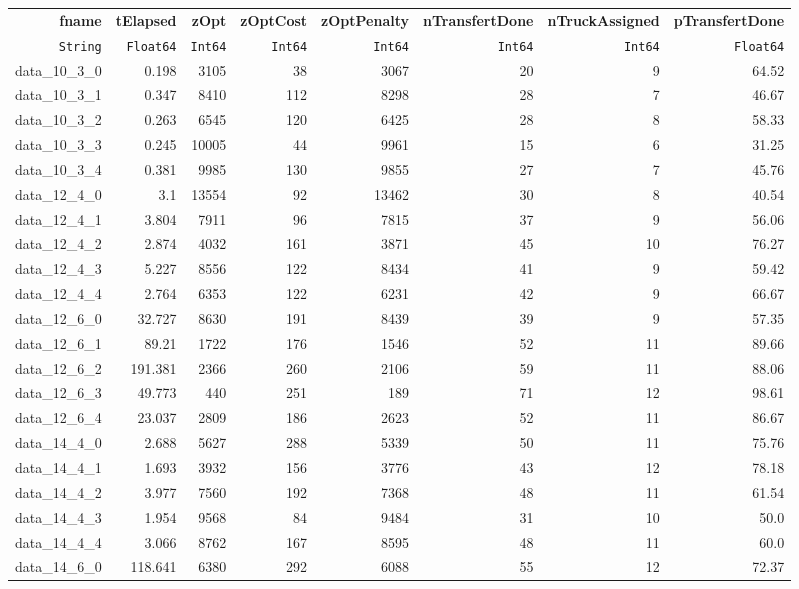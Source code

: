 \begin{tabular}{rrrrrrrr}
  \hline
  \textbf{fname} & \textbf{tElapsed} & \textbf{zOpt} & \textbf{zOptCost} & \textbf{zOptPenalty} & \textbf{nTransfertDone} & \textbf{nTruckAssigned} & \textbf{pTransfertDone} \\
  \texttt{String} & \texttt{Float64} & \texttt{Int64} & \texttt{Int64} & \texttt{Int64} & \texttt{Int64} & \texttt{Int64} & \texttt{Float64} \\\hline
  data\_10\_3\_0 & 0.198 & 3105 & 38 & 3067 & 20 & 9 & 64.52 \\
  data\_10\_3\_1 & 0.347 & 8410 & 112 & 8298 & 28 & 7 & 46.67 \\
  data\_10\_3\_2 & 0.263 & 6545 & 120 & 6425 & 28 & 8 & 58.33 \\
  data\_10\_3\_3 & 0.245 & 10005 & 44 & 9961 & 15 & 6 & 31.25 \\
  data\_10\_3\_4 & 0.381 & 9985 & 130 & 9855 & 27 & 7 & 45.76 \\
  data\_12\_4\_0 & 3.1 & 13554 & 92 & 13462 & 30 & 8 & 40.54 \\
  data\_12\_4\_1 & 3.804 & 7911 & 96 & 7815 & 37 & 9 & 56.06 \\
  data\_12\_4\_2 & 2.874 & 4032 & 161 & 3871 & 45 & 10 & 76.27 \\
  data\_12\_4\_3 & 5.227 & 8556 & 122 & 8434 & 41 & 9 & 59.42 \\
  data\_12\_4\_4 & 2.764 & 6353 & 122 & 6231 & 42 & 9 & 66.67 \\
  data\_12\_6\_0 & 32.727 & 8630 & 191 & 8439 & 39 & 9 & 57.35 \\
  data\_12\_6\_1 & 89.21 & 1722 & 176 & 1546 & 52 & 11 & 89.66 \\
  data\_12\_6\_2 & 191.381 & 2366 & 260 & 2106 & 59 & 11 & 88.06 \\
  data\_12\_6\_3 & 49.773 & 440 & 251 & 189 & 71 & 12 & 98.61 \\
  data\_12\_6\_4 & 23.037 & 2809 & 186 & 2623 & 52 & 11 & 86.67 \\
  data\_14\_4\_0 & 2.688 & 5627 & 288 & 5339 & 50 & 11 & 75.76 \\
  data\_14\_4\_1 & 1.693 & 3932 & 156 & 3776 & 43 & 12 & 78.18 \\
  data\_14\_4\_2 & 3.977 & 7560 & 192 & 7368 & 48 & 11 & 61.54 \\
  data\_14\_4\_3 & 1.954 & 9568 & 84 & 9484 & 31 & 10 & 50.0 \\
  data\_14\_4\_4 & 3.066 & 8762 & 167 & 8595 & 48 & 11 & 60.0 \\
  data\_14\_6\_0 & 118.641 & 6380 & 292 & 6088 & 55 & 12 & 72.37 \\

\end{tabular}
